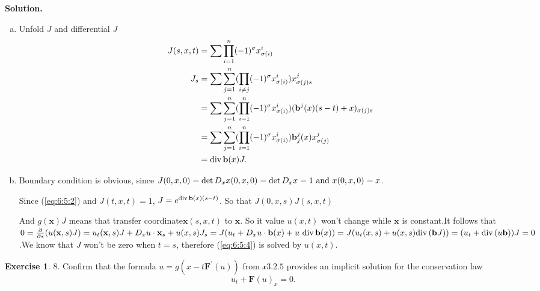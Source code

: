 \message{ !name(PDE-hw6-21935004-\unexpanded{谭焱}.tex)}\documentclass[a4paper]{book}
\newenvironment{solution}%
{\noindent\textbf{Solution.}}%
{\qedhere}
\numberwithin{equation}{chapter}
\theoremstyle{definition}
\newtheorem{exc}[exm]{Exercise}
\begin{document}
\begin{solution}
  \begin{enumerate} [(a)]
  \item Unfold $J$ and differential $J$
    \begin{align*}
      J(s,x,t) &= \sum \prod_{i = 1}^n (-1)^{\sigma} x^i_{\sigma(i)} \\
      J_s &= \sum \sum_{j = 1}^n (\prod_{i \neq j} (-1)^{\sigma} x^i_{\sigma(i)}) x^j_{\sigma(j) s}  \\
               &= \sum \sum _{j = 1}^n (\prod_{i=1}^n (-1)^{\sigma} x^i_{\sigma(i)}) (\mathbf{b}^j(x)(s -t) + x)_{\sigma(j)s} \\
               &=  \sum \sum _{j = 1}^n (\prod_{i=1}^n (-1)^{\sigma} x^i_{\sigma(i)}) \mathbf{b}^j_j(x)x^j_{\sigma(j)}  \\
      &= \textmd{div}\, \mathbf{b}(x)J.
    \end{align*}

  \item Boundary condition is obvious, since $J(0,x,0) = \det D_x x(0,x,0) = \det D_x x = 1 \textmd{ and } x(0,x,0) = x$.

    Since (\ref{eq:6:5:2}) and $J(t,x,t) = 1$, $J = e^{\textmd{div}\, \mathbf{b}(x)(s - t)}$. So that $J(0,x,s)J(s,x,t)$ 

    And $g(\mathbf{x}) J$ means that transfer coordinate$\mathbf{x}(s,x,t)$ to $\mathbf{x}$. So it value $u(x,t)$ won't change while $\mathbf{x}$ is constant.It follows that $0 = \frac{\partial}{\partial s}(u(\mathbf{x},s)J) = u_t(\mathbf{x},s)J + D_x u \cdot \mathbf{x}_s + u(x,s)J_s = J(u_t + D_x u \cdot \mathbf{b}(x) + u \textmd{ div}\, \mathbf{b}(x) ) = J(u_t(x,s) + u(x,s)\textmd{div}\, (\mathbf{b}J)) = (u_t + \textmd{div}\, (u\mathbf{b}))J = 0$.We know that $J$ won't be zero when $t = s$, therefore (\ref{eq:6:5:4}) is solved by $u(x,t)$.
  \end{enumerate}
\end{solution}

\begin{exc}
  8.  Confirm that the formula $u = g(x - t \mathbf{F}^\prime (u))$ from $\mathcal{x}3.2.5$ provides an implicit solution for the conservation law
  \begin{equation}
    \label{eq:6:6:1}
    u_t + \mathbf{F}(u)_x = 0.
  \end{equation}
\end{exc}
\end{document}
